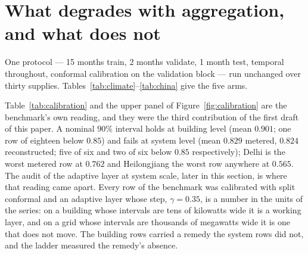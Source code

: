 \section{What degrades with aggregation, and what does not}
\label{sec:calibration}

One protocol --- 15 months train, 2 months validate, 1 month test, temporal
throughout, conformal calibration on the validation block --- run unchanged over
thirty supplies. Tables~\ref{tab:climate}--\ref{tab:china} give the five arms.











Table~\ref{tab:calibration} and the upper panel of Figure~\ref{fig:calibration}
are the benchmark's own reading, and they were the third contribution of the
first draft of this paper. A nominal $90\%$ interval holds at building level
(mean $0.901$; one row of eighteen below $0.85$) and fails at system level
(mean $0.829$ metered, $0.824$ reconstructed; five of six and two of six below
$0.85$ respectively); Delhi is the worst metered row at $0.762$ and
Heilongjiang the worst row anywhere at $0.565$. The audit of the adaptive layer
at system scale, later in this section, is where that reading came apart.
Every row of the benchmark was calibrated with split conformal and an adaptive
layer whose step, $\gamma=0.35$, is a number in the units of the series: on a
building whose intervals are tens of kilowatts wide it is a working layer, and
on a grid whose intervals are thousands of megawatts wide it is one that does
not move. The building rows carried a remedy the system rows did not, and the
ladder measured the remedy's absence.

